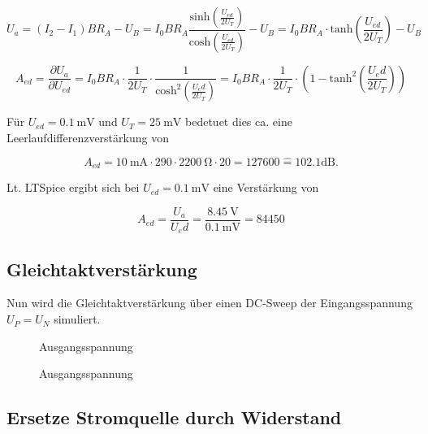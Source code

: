 \begin{equation}
    U_a = ( I_2 - I_1 ) B R_A - U_B = I_0BR_A \frac{\text{sinh}\left( \frac{U_{ed}}{2U_T}  \right)}{\text{cosh}\left( \frac{U_{ed}}{2U_T}  \right)} - U_B = I_0BR_A \cdot \text{tanh}\left( \frac{U_{ed}}{2U_T} \right) - U_B
\end{equation}

\begin{equation}
    A_{ed} = \frac{\partial U_a}{\partial U_{ed}} = I_0BR_A \cdot \frac{1}{2U_T} \cdot \frac{1}{\text{cosh}^2\left( \frac{U_ed}{2U_T}  \right)} = I_0BR_A \cdot \frac{1}{2U_T} \cdot \left( 1 - \text{tanh}^2\left(\frac{U_ed}{2U_T} \right) \right)
\end{equation}

Für $U_{ed} = \SI{0.1}{\milli\volt}$ und $U_T = \SI{25}{\milli\volt}$ bedetuet dies ca. eine Leerlaufdifferenzverstärkung von

\begin{equation}
    A_{ed} = \SI{10}{\milli\ampere} \cdot 290 \cdot \SI{2200}{\ohm} \cdot 20 = 127600 \hat{=} 102.1 \text{dB} .
\end{equation}

Lt. LTSpice ergibt sich bei $U_{ed} = \SI{0.1}{\milli\volt}$ eine Verstärkung von

\begin{equation}
    A_{ed} = \frac{U_a}{U_ed} = \frac{\SI{8.45}{\volt}}{\SI{0.1}{\milli\volt}} = 84 450
\end{equation}

\subsection{Gleichtaktverstärkung}
Nun wird die Gleichtaktverstärkung über einen DC-Sweep der Eingangsspannung $U_P = U_N$ simuliert.

\begin{figure}[H]
	\centering \small
	\scalebox{0.9}{}
	\caption{Ausgangsspannung}
	\label{fig_Kap5_13:transfer}
\end{figure}

\begin{figure}[H]
	\centering \small
	\scalebox{0.9}{}
	\caption{Ausgangsspannung}
	\label{fig_Kap5_13:transfer}
\end{figure}

\subsection{Ersetze Stromquelle durch Widerstand}


